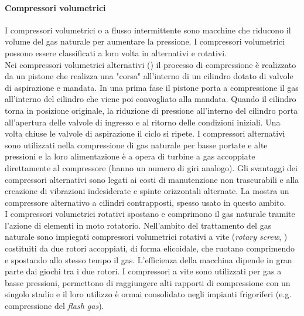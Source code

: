 \paragraph{Compressori volumetrici}
I compressori volumetrici o a flusso intermittente sono macchine che riducono il volume del gas naturale per aumentare la pressione. I compressori volumetrici possono essere classificati a loro volta in alternativi e rotativi.\\
Nei compressori volumetrici alternativi () il processo di compressione è realizzato da un pistone che realizza una "corsa" all'interno di un cilindro dotato di valvole di aspirazione e mandata. In una prima fase il pistone porta a compressione il gas all'interno del cilindro che viene poi convogliato alla mandata. Quando il cilindro torna in posizione originale, la riduzione di pressione all'interno del cilindro porta all'apertura delle valvole di ingresso e al ritorno delle condizioni iniziali. Una volta chiuse le valvole di aspirazione il ciclo si ripete. I compressori alternativi sono utilizzati nella compressione di gas naturale per basse portate e alte pressioni e la loro alimentazione è a opera di turbine a gas accoppiate direttamente al compressore (hanno un numero di giri analogo). Gli svantaggi dei compressori alternativi sono legati ai costi di manutenzione non trascurabili e alla creazione di vibrazioni indesiderate e spinte orizzontali alternate. La  mostra un compressore alternativo a cilindri contrapposti, spesso usato in questo ambito.\\
I compressori volumetrici rotativi spostano e comprimono il gas naturale tramite l'azione di elementi in moto rotatorio. Nell'ambito del trattamento del gas naturale sono impiegati compressori volumetrici rotativi a vite (\textit{rotary screw}, ) costituiti da due rotori accoppiati, di forma elicoidale, che ruotano comprimendo e spostando allo stesso tempo il gas. L'efficienza della macchina dipende in gran parte dai giochi tra i due rotori. I compressori a vite sono utilizzati per gas a basse pressioni, permettono di raggiungere alti rapporti di compressione con un singolo stadio e il loro utilizzo è ormai consolidato negli impianti frigoriferi (e.g. compressione del \textit{flash gas}). 

